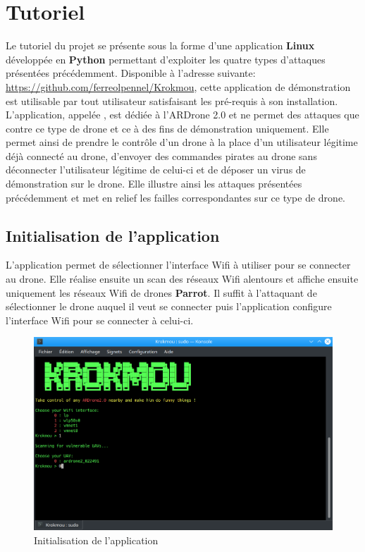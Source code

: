\section{Tutoriel}
Le tutoriel du projet se présente sous la forme d'une application \textbf{Linux} développée en \textbf{Python} permettant d'exploiter les quatre types d'attaques présentées précédemment. Disponible à l'adresse suivante: \url{https://github.com/ferreolpennel/Krokmou}, cette application de démonstration est utilisable par tout utilisateur satisfaisant les pré-requis à son installation. L'application, appelée , est dédiée à l'ARDrone 2.0 et ne permet des attaques que contre ce type de drone et ce à des fins de démonstration uniquement. Elle permet ainsi de prendre le contrôle d'un drone à la place d'un utilisateur légitime déjà connecté au drone, d'envoyer des commandes pirates au drone sans déconnecter l'utilisateur légitime de celui-ci et de déposer un virus de démonstration sur le drone. Elle illustre ainsi les attaques présentées précédemment et met en relief les failles correspondantes sur ce type de drone.

\subsection{Initialisation de l'application}
L'application permet de sélectionner l'interface Wifi à utiliser pour se connecter au drone. Elle réalise ensuite un scan des réseaux Wifi alentours et affiche ensuite uniquement les réseaux Wifi de drones \textbf{Parrot}. Il suffit à l'attaquant de sélectionner le drone auquel il veut se connecter puis l'application configure l'interface Wifi pour se connecter à celui-ci.

\begin{figure}[H]
  \centering
  \includegraphics[scale=0.35]{images/opening.png}
  \caption{Initialisation de l'application}
\end{figure}

